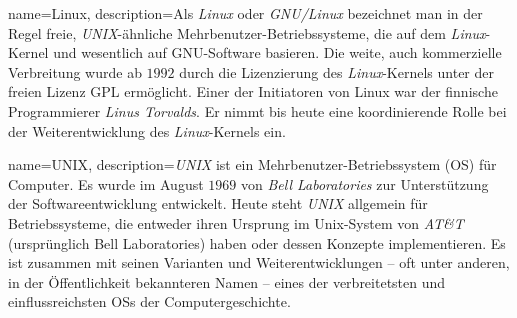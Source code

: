 	{%
		name={Linux},
		description={Als \textit{Linux} oder \textit{GNU/Linux} bezeichnet man in der Regel freie, \textit{UNIX}-ähnliche Mehrbenutzer-Betriebssysteme, die auf dem \textit{Linux}-Kernel und wesentlich auf GNU-Software basieren. Die weite, auch kommerzielle Verbreitung wurde ab $1992$ durch die Lizenzierung des \textit{Linux}-Kernels unter der freien Lizenz GPL ermöglicht. Einer der Initiatoren von Linux war der finnische Programmierer \textit{Linus Torvalds}. Er nimmt bis heute eine koordinierende Rolle bei der Weiterentwicklung des \textit{Linux}-Kernels ein.}
	}

	{%
		name={UNIX},
		description={\textit{UNIX} ist ein Mehrbenutzer-Betriebssystem (OS) für Computer. Es wurde im August $1969$ von \textit{Bell Laboratories} zur Unterstützung der Softwareentwicklung entwickelt. Heute steht \textit{UNIX} allgemein für Betriebssysteme, die entweder ihren Ursprung im Unix-System von \textit{AT\&T} (ursprünglich Bell Laboratories) haben oder dessen Konzepte implementieren. Es ist zusammen mit seinen Varianten und Weiterentwicklungen – oft unter anderen, in der Öffentlichkeit bekannteren Namen – eines der verbreitetsten und einflussreichsten OSs der Computergeschichte.}
	}

\fi
